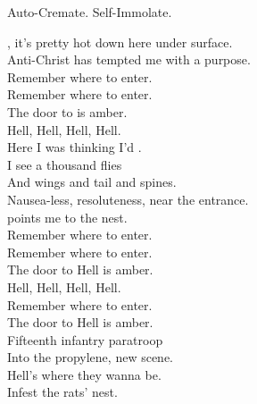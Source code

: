 Auto-Cremate. Self-Immolate. \\





, it's pretty hot down here under surface. \\
Anti-Christ has tempted me with a purpose. \\

Remember where to enter. \\
Remember where to enter. \\
The door to  is amber. \\

Hell, Hell, Hell, Hell. \\

Here I was thinking I'd . \\
I see a thousand flies \\
And wings and tail and spines. \\

Nausea-less, resoluteness, near the entrance. \\
 points me to the  nest. \\

Remember where to enter.\\
Remember where to enter. \\
The door to Hell is amber. \\

Hell, Hell, Hell, Hell. \\

Remember where to enter. \\
The door to Hell is amber. \\

Fifteenth infantry paratroop \\
Into the propylene, new scene. \\
Hell's where they wanna be. \\
Infest the rats' nest. \\
